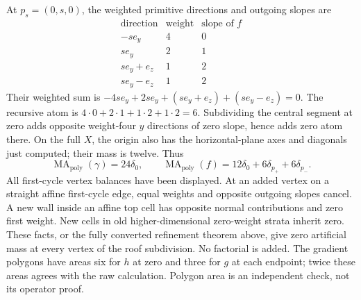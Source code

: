 \documentclass[11pt]{article}
\newcommand{\MA}{\operatorname{MA}_{\mathrm{poly}}}
\begin{document}
At $p_s=(0,s,0)$, the weighted primitive directions and outgoing slopes are
\[
\begin{array}{c|c|c}
\text{direction}&\text{weight}&\text{slope of }f\\\hline
-s e_y&4&0\\
s e_y&2&1\\
s e_y+e_z&1&2\\
s e_y-e_z&1&2
\end{array}
\]
Their weighted sum is $-4s e_y+2s e_y+(s e_y+e_z)+(s e_y-e_z)=0$.
The recursive atom is $4\cdot0+2\cdot1+1\cdot2+1\cdot2=6$.
Subdividing the central segment at zero adds opposite weight-four
$y$ directions of zero slope, hence adds zero atom there.
On the full $X$, the origin also has the horizontal-plane axes and
diagonals just computed; their mass is twelve. Thus
\begin{equation}\label{new-masses}
 \MA(\gamma)=24\delta_0,\qquad
 \MA(f)=12\delta_0+6\delta_{p_+}+6\delta_{p_-}.
\end{equation}
All first-cycle vertex balances have been displayed. At an added vertex
on a straight affine first-cycle edge, equal weights and opposite
outgoing slopes cancel. A new wall inside an affine top cell has
opposite normal contributions and zero first weight. New cells in
old higher-dimensional zero-weight strata inherit zero. These facts,
or the fully converted refinement theorem above, give zero artificial
mass at every vertex of the roof subdivision. No factorial is added.
The gradient polygons have areas six for $h$ at zero and three for
$g$ at each endpoint; twice these areas agrees with the raw calculation.
Polygon area is an independent check, not its operator proof.
\end{document}
